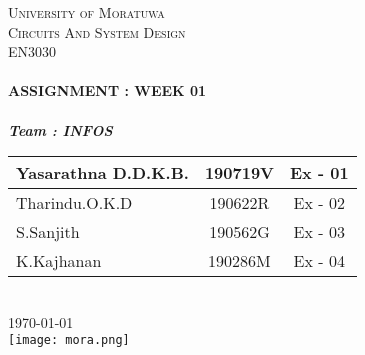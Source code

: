 \documentclass[11pt]{article}
\begin{document}
    \begin{titlepage}
        \center
        \textsc{\LARGE University of Moratuwa}\\[.5cm]

        \textsc{\Large Circuits And System Design}\\[0.2cm]
        \textsc{\large EN3030}\\[1cm]                                        %
        \HRule \\[0.4cm]
        { \Large \bfseries ASSIGNMENT : WEEK 01}\\[0.25cm]
        \HRule \\[1cm]
        \large
        \textbf{\emph{\large Team : INFOS}}\\
        [0.3cm]
        \begin{tabular}{ |l| c|c| }
            \toprule
            Yasarathna D.D.K.B. & 190719V & Ex - 01 \\
            \midrule
            Tharindu.O.K.D      & 190622R& Ex - 02 \\
            \midrule
            S.Sanjith           & 190562G & Ex - 03\\
            \midrule
            K.Kajhanan & 190286M & Ex - 04\\
            \midrule
        \end{tabular}\\
        [.5cm]
        {\large \today}\\[1cm]
        \texttt{[image: mora.png]}\\[1cm]    %
        \tableofcontents
        \vfill
        \HRule
    \end{titlepage}
\end{document}
